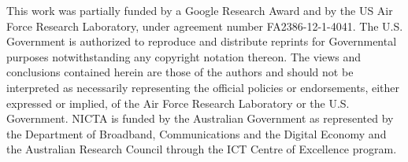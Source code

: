  This work was partially funded by a Google Research Award and by the US Air 
 Force Research Laboratory, under agreement number FA2386-12-1-4041. The U.S. 
 Government is authorized to reproduce and distribute reprints for Governmental 
 purposes notwithstanding any copyright notation thereon. The views and conclusions 
 contained herein are those of the authors and should not be interpreted as 
 necessarily representing the official policies or endorsements, either expressed 
 or implied, of the Air Force Research Laboratory or the U.S. Government. 
 NICTA is funded by the Australian Government as represented by the Department 
 of Broadband, Communications and the Digital Economy and the Australian Research 
 Council through the ICT Centre of Excellence program.
